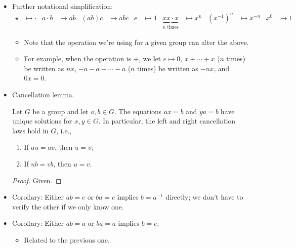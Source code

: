 \documentclass[../notes.tex]{subfiles}
\begin{document}
\begin{itemize}
\begin{proposition}
\begin{enumerate}
            \item \textbf{Generalized associative law}: For any $a_1,\dots,a_n\in G$, the value of $a_1\star\cdots\star a_n$ is independent of how the expression is bracketed.
        \end{enumerate}
        \begin{proof}
            Given.
        \end{proof}
    \end{proposition}
    \item Further notational simplification:
    \begin{align*}
        \star &\mapsto \cdot&
        a\cdot b &\mapsto ab&
        (ab)c &\mapsto abc&
        e &\mapsto 1&
        \underbrace{xx\cdot x}_{n\text{ times}} &\mapsto x^n&
        (x^{-1})^n &\mapsto x^{-n}&
        x^0 &\mapsto 1
    \end{align*}
    \begin{itemize}
        \item Note that the operation we're using for a given group can alter the above.
        \item For example, when the operation is $+$, we let $e\mapsto 0$, $x+\cdots+x$ ($n$ times) be written as $nx$, $-a-a-\cdots-a$ ($n$ times) be written as $-nx$, and $0x=0$.
    \end{itemize}
    \item Cancellation lemma.
    \begin{proposition}
        Let $G$ be a group and let $a,b\in G$. The equations $ax=b$ and $ya=b$ have unique solutions for $x,y\in G$. In particular, the left and right cancellation laws hold in $G$, i.e.,
        \begin{enumerate}
            \item If $au=av$, then $u=v$;
            \item If $ub=vb$, then $u=v$.
        \end{enumerate}
        \begin{proof}
            Given.
        \end{proof}
    \end{proposition}
    \item Corollary: Either $ab=e$ or $ba=e$ implies $b=a^{-1}$ directly; we don't have to verify the other if we only know one.
    \item Corollary: Either $ab=a$ or $ba=a$ implies $b=e$.
    \begin{itemize}
        \item Related to the previous one.

\end{itemize}
\end{itemize}
\end{document}
